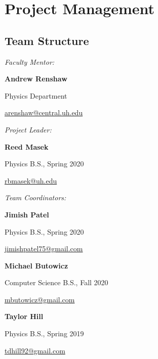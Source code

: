 \section{Project Management}
\label{sec:Management}

\subsection{Team Structure}
\label{sec:Team}

\emph{Faculty Mentor:}\par
\hspace{1cm} \textbf{Andrew Renshaw}\par
\hspace{1cm} Physics Department\par
\hspace{1cm} \url{arenshaw@central.uh.edu}\par
\vspace{.1in}

\emph{Project Leader:}\par
\hspace{1cm} \textbf{Reed Masek}\par
\hspace{1cm} Physics B.S., Spring 2020\par
\hspace{1cm} \url{rbmasek@uh.edu}\par
\vspace{.1in}

\emph{Team Coordinators:}\par
\hspace{1cm} \textbf{Jimish Patel}\par
\hspace{1cm} Physics B.S., Spring 2020\par
\hspace{1cm} \url{jimishpatel75@gmail.com}\par
\vspace{.05in}
\hspace{1cm} \textbf{Michael Butowicz}\par
\hspace{1cm}  Computer Science B.S., Fall 2020\par
\hspace{1cm} \url{mbutowicz@gmail.com}\par
\vspace{.05in}
\hspace{1cm} \textbf{Taylor Hill}\par
\hspace{1cm} Physics B.S., Spring 2019\par
\hspace{1cm} \url{tdhill92@gmail.com}\par

